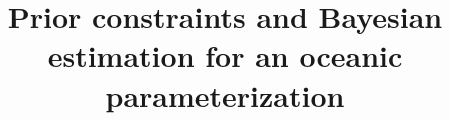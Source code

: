 \documentclass[draft]{agujournal2019}
\begin{document}
%
%


\title{Prior constraints and Bayesian estimation for an oceanic parameterization}

%
%











\end{document}
